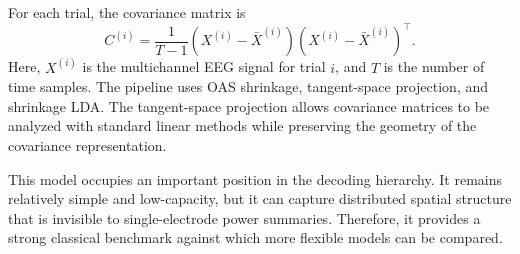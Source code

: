 \documentclass[11pt,a4paper,chapterprefix=false,parskip=false]{scrreprt}
\begin{document}
For each trial, the covariance matrix is
\begin{equation}
    C^{(i)} = \frac{1}{T-1}(X^{(i)}-\bar{X}^{(i)})(X^{(i)}-\bar{X}^{(i)})^\top.
\end{equation}
Here, $X^{(i)}$ is the multichannel EEG signal for trial $i$, and $T$ is the number of time samples. The pipeline uses OAS shrinkage, tangent-space projection, and shrinkage LDA. The tangent-space projection allows covariance matrices to be analyzed with standard linear methods while preserving the geometry of the covariance representation.

This model occupies an important position in the decoding hierarchy. It remains relatively simple and low-capacity, but it can capture distributed spatial structure that is invisible to single-electrode power summaries. Therefore, it provides a strong classical benchmark against which more flexible models can be compared.
\end{document}
